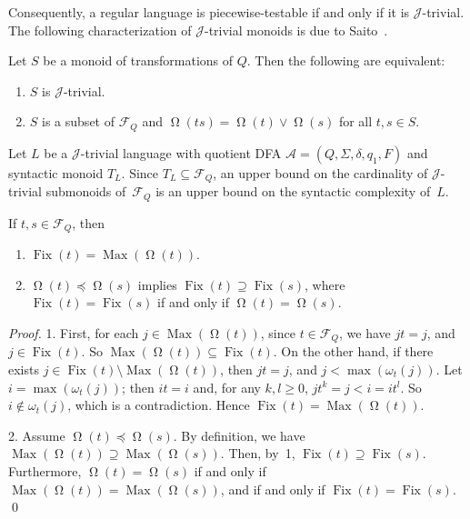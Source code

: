 \documentclass{llncs}
\renewcommand{\ge}{\geqslant}
\newcommand{\Sig}{\Sigma}
\newcommand{\be}{\begin{enumerate}}
\newcommand{\ee}{\end{enumerate}}
\newcommand{\cA}{{\mathcal A}}
\newcommand{\cF}{{\mathcal F}}
\newcommand{\gJ}{{\mathcal J}}
\newcommand{\join}{{\mathbin{\vee}}}
\DeclareMathOperator{\Fix}{Fix}
\DeclareMathOperator{\Orbit}{\Omega}
\DeclareMathOperator{\Max}{Max}
\begin{document}
Consequently, a regular language is piecewise-testable if and only if it is $\gJ$-trivial. The following characterization of $\gJ$-trivial monoids is due to Saito~\cite{Sai98}. 

\begin{theorem}[Saito]\label{thm:saito}
Let $S$ be a monoid of transformations of $Q$. Then the following are equivalent:
\be
\item 
$S$ is $\gJ$-trivial.
\item 
$S$ is a subset of $\cF_Q$ and $\Orbit(ts) = \Orbit(t) \join \Orbit(s)$ for all $t, s \in S$. 
\ee
\end{theorem}


\vspace{12pt}
Let $L$ be a  $\gJ$-trivial language with quotient DFA $\cA = (Q, \Sig, \delta, q_1, F)$ and syntactic monoid $T_L$. Since $T_L\subseteq \cF_Q$, an upper bound on the cardinality of $\gJ$-trivial submonoids of~$\cF_Q$ is an upper bound on the syntactic complexity of~$L$. 

\begin{lemma}\label{lem:fixmax} 
If $t,s \in \cF_Q$, then
\be
\item 
$\Fix(t) = \Max(\Orbit(t))$.
\item 
$\Orbit(t) \preceq \Orbit(s)$ implies $\Fix(t) \supseteq \Fix(s)$, where $\Fix(t) = \Fix(s)$ if and only if $\Orbit(t) = \Orbit(s)$.
\ee 
\end{lemma}

\begin{proof} 
1. First, for each $j \in \Max(\Orbit(t))$, since $t \in \cF_Q$, we have $jt = j$, and $j \in \Fix(t)$. So $\Max(\Orbit(t)) \subseteq \Fix(t)$. On the other hand, if there exists $j \in \Fix(t) \setminus \Max(\Orbit(t))$, then $jt = j$, and $j < \max(\omega_t(j))$. Let $i = \max(\omega_t(j))$; then $it = i$ and, for any $k, l \ge 0$, $jt^k = j < i = it^l$. So $i \not\in \omega_t(j)$, which is a contradiction. Hence $\Fix(t) = \Max(\Orbit(t))$. 

2. Assume $\Orbit(t) \preceq \Orbit(s)$. By definition, we have $\Max(\Orbit(t)) \supseteq \Max(\Orbit(s))$. Then, by~1, $\Fix(t) \supseteq \Fix(s)$. Furthermore, $\Orbit(t) = \Orbit(s)$ if and only if $\Max(\Orbit(t)) = \Max(\Orbit(s))$, and if and only if $\Fix(t) = \Fix(s)$. \qed
\end{proof}
\end{document}
